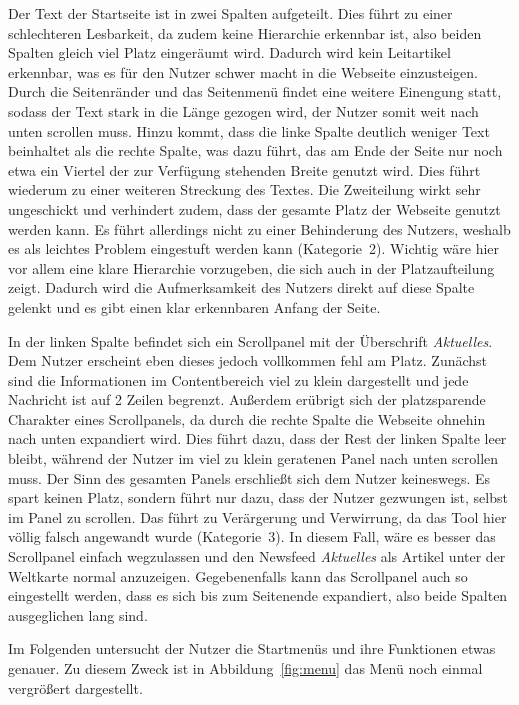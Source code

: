 {Der Text der Startseite ist in zwei Spalten aufgeteilt. Dies führt zu einer schlechteren Lesbarkeit, da zudem keine Hierarchie erkennbar ist, also beiden Spalten gleich viel Platz eingeräumt wird.
Dadurch wird kein Leitartikel erkennbar, was es für den Nutzer schwer macht in die Webseite einzusteigen. 
Durch die Seitenränder und das Seitenmenü findet eine weitere Einengung statt, sodass der Text stark in die Länge gezogen wird, der Nutzer somit weit nach unten scrollen muss.
Hinzu kommt, dass die linke Spalte deutlich weniger Text beinhaltet als die rechte Spalte, was dazu führt, das am Ende der Seite nur noch etwa ein Viertel der zur Verfügung stehenden Breite genutzt wird. Dies führt wiederum zu einer weiteren Streckung des Textes. 
}{Die Zweiteilung wirkt sehr ungeschickt und verhindert zudem, dass der gesamte Platz der Webseite genutzt werden kann. Es führt allerdings nicht zu einer Behinderung des Nutzers, weshalb es als leichtes Problem eingestuft werden kann (Kategorie~2).
}{Wichtig wäre hier vor allem eine klare Hierarchie vorzugeben, die sich auch in der Platzaufteilung zeigt. Dadurch wird die Aufmerksamkeit des Nutzers direkt auf diese Spalte gelenkt und es gibt einen klar erkennbaren Anfang der Seite.}\label{prob:start:design}

{In der linken Spalte befindet sich ein Scrollpanel mit der Überschrift \emph{Aktuelles}. Dem Nutzer erscheint eben dieses jedoch vollkommen fehl am Platz.
Zunächst sind die Informationen im Contentbereich viel zu klein dargestellt und jede Nachricht ist auf 2 Zeilen begrenzt. Außerdem erübrigt sich der platzsparende Charakter eines Scrollpanels, da durch die rechte Spalte die Webseite ohnehin nach unten expandiert wird. 
Dies führt dazu, dass der Rest der linken Spalte leer bleibt, während der Nutzer im viel zu klein geratenen Panel nach unten scrollen muss.
}{
Der Sinn des gesamten Panels erschließt sich dem Nutzer keineswegs. Es spart keinen Platz, sondern führt nur dazu, dass der Nutzer gezwungen ist, selbst im Panel zu scrollen. Das führt zu Verärgerung und Verwirrung, da das Tool hier völlig falsch angewandt wurde (Kategorie~3).
}{
In diesem Fall, wäre es besser das Scrollpanel einfach wegzulassen und den Newsfeed \emph{Aktuelles} als Artikel unter der Weltkarte normal anzuzeigen. Gegebenenfalls kann das Scrollpanel auch so eingestellt werden, dass es sich bis zum Seitenende expandiert, also beide Spalten ausgeglichen lang sind. 
}\label{prob:start:panel}

Im Folgenden untersucht der Nutzer die Startmenüs und ihre Funktionen etwas genauer. Zu diesem Zweck ist in Abbildung~\ref{fig:menu} das Menü noch einmal vergrößert dargestellt.

